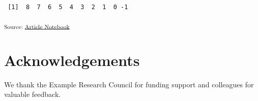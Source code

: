 \documentclass[
  authoryear,
  5p,
  twocolumn]{elsarticle}
\begin{document}
\begin{verbatim}
 [1]  8  7  6  5  4  3  2  1  0 -1
\end{verbatim}

\textsubscript{Source:
\href{https://lbm364dl.github.io/test-paper/index.qmd.html}{Article
Notebook}}

\section*{Acknowledgements}\label{acknowledgements}

We thank the Example Research Council for funding support and colleagues
for valuable feedback.



\end{document}
